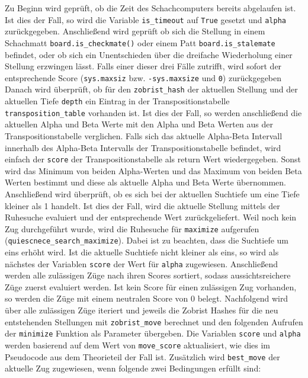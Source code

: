 Zu Beginn wird geprüft, ob die Zeit des Schachcomputers bereits
abgelaufen ist. Ist dies der Fall, so wird die Variable
\texttt{is\_timeout} auf \texttt{True} gesetzt und \texttt{alpha}
zurückgegeben. Anschließend wird geprüft ob sich die Stellung in einem
Schachmatt \texttt{board.is\_checkmate()} oder einem Patt
\texttt{board.is\_stalemate} befindet, oder ob sich ein Unentschieden
über die dreifache Wiederholung einer Stellung erzwingen lässt. Falls
einer dieser drei Fälle zutrifft, wird sofort der entsprechende Score
(\texttt{sys.maxsiz} bzw. \texttt{-sys.maxsize} und \texttt{0})
zurückgegeben Danach wird überprüft, ob für den \texttt{zobrist\_hash}
der aktuellen Stellung und der aktuellen Tiefe \texttt{depth} ein
Eintrag in der Transpositionstabelle \texttt{transposition\_table}
vorhanden ist. Ist dies der Fall, so werden anschließend die aktuellen
Alpha und Beta Werte mit den Alpha und Beta Werten aus der
Transpositionstabelle verglichen. Falls sich das aktuelle Alpha-Beta
Intervall innerhalb des Alpha-Beta Intervalls der Transpositionstabelle
befindet, wird einfach der \texttt{score} der Transpositionstabelle als
return Wert wiedergegeben. Sonst wird das Minimum von beiden
Alpha-Werten und das Maximum von beiden Beta Werten bestimmt und diese
als aktuelle Alpha und Beta Werte übernommen. Anschließend wird
überprüft, ob es sich bei der aktuellen Suchtiefe um eine Tiefe kleiner
als 1 handelt. Ist dies der Fall, wird die aktuelle Stellung mittels der
Ruhesuche evaluiert und der entsprechende Wert zurückgeliefert. Weil
noch kein Zug durchgeführt wurde, wird die Ruhesuche für
\texttt{maximize} aufgerufen (\texttt{quiescnece\_search\_maximize}).
Dabei ist zu beachten, dass die Suchtiefe um eins erhöht wird. Ist die
aktuelle Suchtiefe nicht kleiner als eins, so wird als nächstes der
Variablen \texttt{score} der Wert für \texttt{alpha} zugewiesen.
Anschließend werden alle zulässigen Züge nach ihren Scores sortiert,
sodass aussichtsreichere Züge zuerst evaluiert werden. Ist kein Score
für einen zulässigen Zug vorhanden, so werden die Züge mit einem
neutralen Score von 0 belegt. Nachfolgend wird über alle zulässigen Züge
iteriert und jeweils die Zobrist Hashes für die neu entstehenden
Stellungen mit \texttt{zobrist\_move} berechnet und den folgenden
Aufrufen der \texttt{minimize} Funktion als Parameter übergeben. Die
Variablen \texttt{score} und \texttt{alpha} werden basierend auf dem
Wert von \texttt{move\_score} aktualisiert, wie dies im Pseudocode aus
dem Theorieteil der Fall ist. Zusätzlich wird \texttt{best\_move} der
aktuelle Zug zugewiesen, wenn folgende zwei Bedingungen erfüllt sind:

